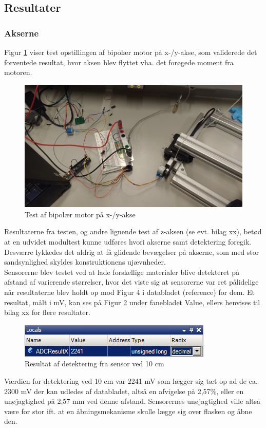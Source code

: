\subsection{Resultater}
\subsubsection{Akserne}


Figur \ref{Bipolar} viser test opstillingen af bipolær motor på x-/y-akse, som validerede det forventede resultat, hvor aksen blev flyttet vha. det forøgede moment fra motoren. \\

\begin{figure}[H]
\includegraphics[scale=0.09]{tex/Test/Motor-sensor/Bipolar_test_opstilling.jpg}
\caption{Test af bipolær motor på x-/y-akse}
\label{Bipolar}
\end{figure}

Resultaterne fra testen, og andre lignende test af z-aksen (se evt. bilag xx), betød at en udvidet modultest kunne udføres hvori akserne samt detektering foregik. Desværre lykkedes det aldrig at få glidende bevægelser på akserne, som med stor sandsynlighed skyldes konstruktionens ujævnheder. \\

Sensorerne blev testet ved at lade forskellige materialer blive detekteret på afstand af varierende størrelser, hvor det viste sig at sensorerne var ret pålidelige når resultaterne blev holdt op mod Figur 4 i databladet (reference) for dem. Et resultat, målt i mV, kan ses på Figur \ref{Sensor_10cm} under fanebladet Value, ellers henvises til bilag xx for flere resultater. \\

\begin{figure}[H]
\includegraphics[scale=1]{tex/Test/Motor-sensor/Sensor_10cm.png}
\caption{Resultat af detektering fra sensor ved 10 cm}
\label{Sensor_10cm}
\end{figure}

Værdien for detektering ved 10 cm var 2241 mV som lægger sig tæt op ad de ca. 2300 mV der kan udledes af databladet, altså en afvigelse på 2,57\%, eller en unøjagtighed på 2,57 mm ved denne afstand. Sensorernes unøjagtighed ville altså være for stor ift. at en åbningsmekanisme skulle lægge sig over flasken og åbne den.